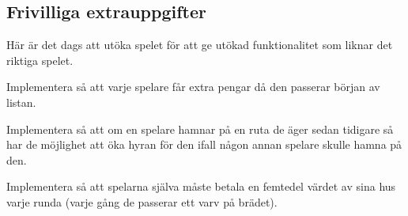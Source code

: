 \subsection{Frivilliga extrauppgifter}

\Task Här är det dags att utöka spelet för att ge utökad funktionalitet som liknar det riktiga spelet.

\Subtask Implementera så att varje spelare får extra pengar då den passerar början av listan.

\Subtask Implementera så att om en spelare hamnar på en ruta de äger sedan tidigare så har de möjlighet att öka hyran för den ifall någon annan spelare skulle hamna på den.

\Subtask Implementera så att spelarna själva måste betala en femtedel värdet av sina hus varje runda (varje gång de passerar ett varv på brädet).
    
